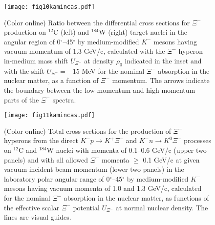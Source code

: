 \documentclass[12pt]{article}
\begin{document}
\begin{figure}[htb]
\begin{center}
\texttt{[image: fig10kamincas.pdf]}
\vspace*{-2mm} \caption{(Color online) Ratio between the differential cross sections for $\Xi^-$
production on $^{12}$C (left) and $^{184}$W (right) target nuclei in the angular region of
0$^{\circ}$--45$^{\circ}$ by medium-modified $K^-$ mesons having vacuum momentum of 1.3 GeV/c,
calculated with the $\Xi^-$ hyperon in-medium mass shift
$U_{\Xi^-}$ at density $\rho_0$ indicated in the inset and with the shift $U_{\Xi^-}=-15$ MeV
for the nominal $\Xi^-$ absorption
in the nuclear matter, as a function of $\Xi^-$ momentum.
The arrows indicate the boundary between the low-momentum and high-momentum parts of the
$\Xi^-$ spectra.}
\label{void}
\end{center}
\end{figure}
\begin{figure}[!h]
\begin{center}
\texttt{[image: fig11kamincas.pdf]}
\vspace*{-2mm} \caption{(Color online) Total cross sections for the production of $\Xi^-$
hyperons from the direct ${K^-}p \to {K^+}{\Xi^-}$ and ${K^-}n \to {K^0}{\Xi^-}$ processes
on $^{12}$C and $^{184}$W nuclei with momenta of 0.1--0.6 GeV/c (upper two panels)
and with all allowed $\Xi^-$ momenta $\ge$ 0.1 GeV/c at given vacuum incident beam momentum
(lower two panels) in the laboratory polar angular range of 0$^{\circ}$--45$^{\circ}$
by medium-modified $K^-$ mesons having vacuum momenta of 1.0 and 1.3 GeV/c,
calculated for the nominal $\Xi^-$ absorption in the nuclear matter,
as functions of the effective scalar $\Xi^-$ potential $U_{\Xi^-}$
at normal nuclear density. The lines are visual guides.}
\label{void}
\end{center}
\end{figure}
\end{document}
